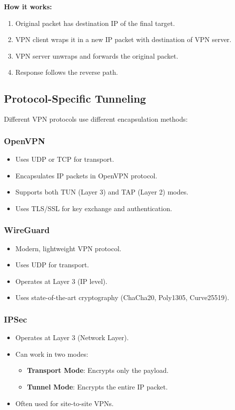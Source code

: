\textbf{How it works:}
\begin{enumerate}
    \item Original packet has destination IP of the final target.
    \item VPN client wraps it in a new IP packet with destination of VPN server.
    \item VPN server unwraps and forwards the original packet.
    \item Response follows the reverse path.
\end{enumerate}

\subsection{Protocol-Specific Tunneling}

Different VPN protocols use different encapsulation methods:

\subsubsection{OpenVPN}
\begin{itemize}
    \item Uses UDP or TCP for transport.
    \item Encapsulates IP packets in OpenVPN protocol.
    \item Supports both TUN (Layer 3) and TAP (Layer 2) modes.
    \item Uses TLS/SSL for key exchange and authentication.
\end{itemize}

\subsubsection{WireGuard}
\begin{itemize}
    \item Modern, lightweight VPN protocol.
    \item Uses UDP for transport.
    \item Operates at Layer 3 (IP level).
    \item Uses state-of-the-art cryptography (ChaCha20, Poly1305, Curve25519).
\end{itemize}

\subsubsection{IPSec}
\begin{itemize}
    \item Operates at Layer 3 (Network Layer).
    \item Can work in two modes:
    \begin{itemize}
        \item \textbf{Transport Mode}: Encrypts only the payload.
        \item \textbf{Tunnel Mode}: Encrypts the entire IP packet.
    \end{itemize}
    \item Often used for site-to-site VPNs.
\end{itemize}

